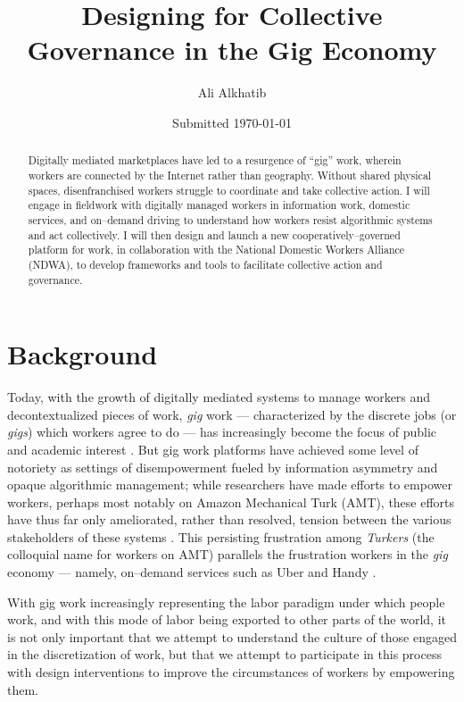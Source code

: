 \documentclass{article}
\title{Designing for Collective Governance in the Gig Economy}
\author{Ali Alkhatib}
\date{Submitted \today}
\newcounter{words}
\newenvironment{counted}{%
  \setcounter{words}{0}
  \SearchList!{wordcount}{\stepcounter{words}}
    {a?,b?,c?,d?,e?,f?,g?,h?,i?,j?,k?,l?,m?,
    n?,o?,p?,q?,r?,s?,t?,u?,v?,w?,x?,y?,z?}
  \UndoBoundary{'}
  \SearchOrder{p;}}{%
  \StopSearching}
\begin{document}
\begin{titlingpage}
    \maketitle
    \begin{abstract}
Digitally mediated marketplaces have led to a resurgence of ``gig'' work,
wherein workers are connected by the Internet rather than geography.
Without shared physical spaces,
disenfranchised workers struggle to coordinate and take collective action. I will engage in fieldwork with digitally managed workers in information work,
domestic services,
and on--demand driving to understand how workers resist algorithmic systems and act collectively. I will then design and launch a new cooperatively--governed platform for work,
in collaboration with the National Domestic Workers Alliance (NDWA),
to develop frameworks and tools to facilitate collective action and governance.
    \end{abstract}
\end{titlingpage}


\section*{Background}

Today, with the growth of digitally mediated systems to manage workers and decontextualized pieces of work,
\textit{gig} work
--- characterized by the discrete jobs (or \textit{gigs}) which workers agree to do  ---
has increasingly become the focus of public and academic interest
\citep{martin2014being,uberAlgorithm,hall2015analysis}.
But gig work platforms have achieved some level of notoriety as settings of disempowerment
fueled by information asymmetry and opaque algorithmic management;
while researchers have made efforts to empower workers,
perhaps most notably on Amazon Mechanical Turk (AMT),
these efforts have thus far only ameliorated,
rather than resolved,
tension between
the various stakeholders of these systems
\citep{turkopticon,dynamo}.
This persisting frustration among \textit{Turkers} (the colloquial name for workers on AMT) parallels the frustration
workers in the \textit{gig} economy
--- namely, on--demand services such as Uber and Handy
\citep{dillahunt2016does,uberRiots,fedsUber,hall2015analysis}.

With gig work increasingly representing the labor paradigm under which people work,
and with this mode of labor being exported to other parts of the world,
it is not only important that we attempt to understand the culture of those engaged in the discretization of work,
but that we attempt to participate in this process with design interventions
to improve the circumstances of workers by empowering them.
\end{document}

